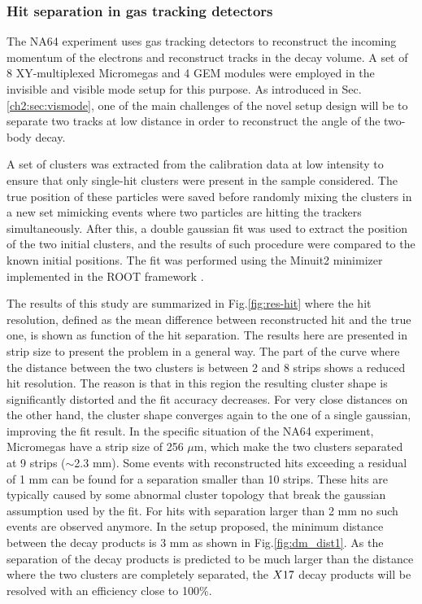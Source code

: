 \subsubsection{Hit separation in gas tracking detectors}
\label{ch5:sec:separ-hit-micr}

The NA64 experiment uses gas tracking detectors to reconstruct the incoming momentum of the electrons and reconstruct tracks in the decay volume. A set of 8 XY-multiplexed Micromegas and 4 GEM modules were employed in the invisible and visible mode setup for this purpose. As introduced in Sec.\ref{ch2:sec:vismode}, one of the main challenges of the novel setup design will be to separate two tracks at low distance in order to reconstruct the angle of the two-body decay.

A set of clusters was extracted from the calibration data at low intensity to ensure that only single-hit clusters were present in the sample considered. The true position of these particles were saved before randomly mixing the clusters in a new set mimicking events where two particles are hitting the trackers simultaneously. After this, a double gaussian fit was used to extract the position of the two initial clusters, and the results of such procedure were compared to the known initial positions. The fit was performed using the Minuit2 minimizer implemented in the ROOT framework \cite{root}.

The results of this study are summarized in Fig.\ref{fig:res-hit} where the hit resolution, defined as the mean difference between reconstructed hit and the true one, is shown as function of the hit separation. The results here are presented in strip size to present the problem in a general way. The part of the curve where the distance between the two clusters is between 2 and 8 strips shows a reduced hit resolution. The reason is that in this region the resulting cluster shape is significantly distorted and the fit accuracy decreases. For very close distances on the other hand, the cluster shape converges again to the one of a single gaussian, improving the fit result. In the specific situation of the NA64 experiment, Micromegas have a strip size of 256 $\mu$m, which make the two clusters separated at 9 strips ($\sim$2.3 mm). Some events with reconstructed hits exceeding a residual of 1 mm can be found for a separation smaller than 10 strips. These hits are typically caused by some abnormal cluster topology that break the gaussian assumption used by the fit. For hits with separation larger than 2 mm no such events are observed anymore. In the setup proposed, the minimum distance between the decay products is 3 mm as shown in Fig.\ref{fig:dm_dist1}. As the separation of the decay products is predicted to be much larger than the distance where the two clusters are completely separated, the $X17$ decay products will be resolved with an efficiency close to 100\%.

